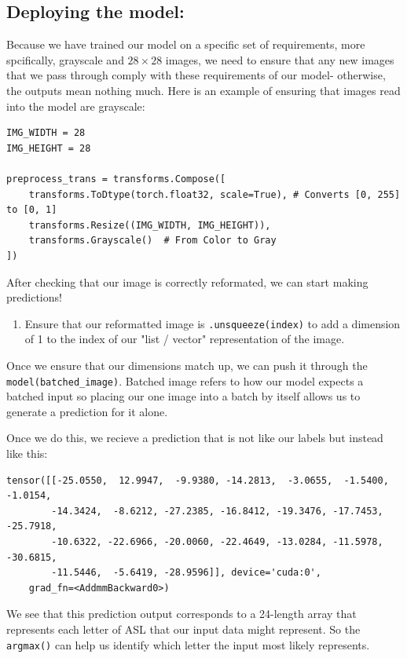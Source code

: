 \documentclass{article}
\begin{document}
\subsection{Deploying the model:}
Because we have trained our model on a specific set of requirements, more spcifically, grayscale and $28 \times 28$ images, we need to ensure that any new images that we pass through comply with these requirements of our model- otherwise, the outputs mean nothing much. Here is an example of ensuring that images read into the model are grayscale: 
\begin{verbatim}
IMG_WIDTH = 28
IMG_HEIGHT = 28

preprocess_trans = transforms.Compose([
    transforms.ToDtype(torch.float32, scale=True), # Converts [0, 255] to [0, 1]
    transforms.Resize((IMG_WIDTH, IMG_HEIGHT)),
    transforms.Grayscale()  # From Color to Gray
])
\end{verbatim} After checking that our image is correctly reformated, we can start making predictions!
\begin{enumerate}
    \item Ensure that our reformatted image is \verb|.unsqueeze(index)| to add a dimension of 1 to the index of our "list / vector" representation of the image. 
\end{enumerate}
Once we ensure that our dimensions match up, we can push it through the \verb|model(batched_image)|. Batched image refers to how our model expects a batched input so placing our one image into a batch by itself allows us to generate a prediction for it alone. 

Once we do this, we recieve a prediction that is not like our labels but instead like this: \begin{verbatim}
tensor([[-25.0550,  12.9947,  -9.9380, -14.2813,  -3.0655,  -1.5400,  -1.0154,
        -14.3424,  -8.6212, -27.2385, -16.8412, -19.3476, -17.7453, -25.7918,
        -10.6322, -22.6966, -20.0060, -22.4649, -13.0284, -11.5978, -30.6815,
        -11.5446,  -5.6419, -28.9596]], device='cuda:0',
    grad_fn=<AddmmBackward0>)
\end{verbatim}
We see that this prediction output corresponds to a 24-length array that represents each letter of ASL that our input data might represent. So the \verb|argmax()| can help us identify which letter the input most likely represents. 
\end{document}
